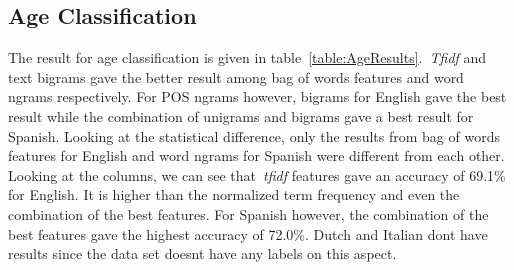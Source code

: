 \documentclass[a4paper]{llncs}
\begin{document}
\subsection{Age Classification}
The result for age classification is given in table~\ref{table:AgeResults}.~\textit{Tfidf} and text bigrams gave the better result among bag of words features and word ngrams respectively. For POS ngrams however, bigrams for English gave the best result while the combination of unigrams and bigrams gave a best result for Spanish. Looking at the statistical difference, only the results from bag of words features for English and word ngrams for Spanish were different from each other. Looking at the columns, we can see that~\textit{tfidf} features gave an accuracy of 69.1\% for English. It is higher than the normalized term frequency and even the combination of the best features. For Spanish however, the combination of the best features gave the highest accuracy of 72.0\%. Dutch and Italian dont have results since the data set doesnt have any labels on this aspect. 
\end{document}
